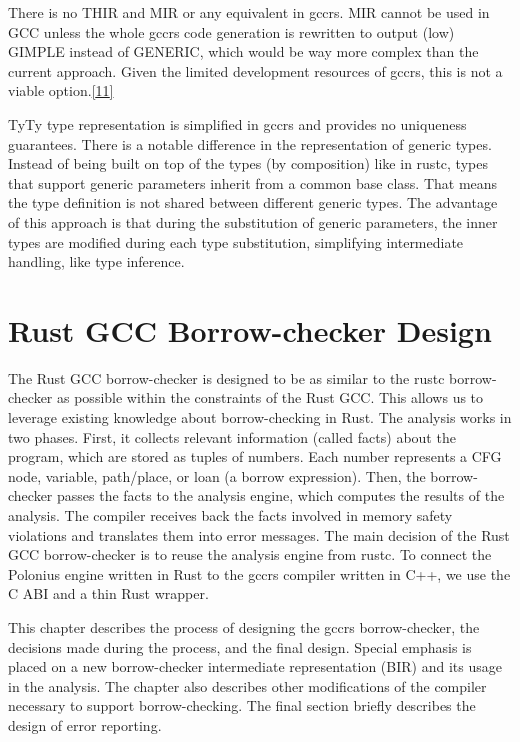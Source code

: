\documentclass[
  11pt,
  twoside,symmetric]{report}
\begin{document}
There is no THIR and MIR or any equivalent in gccrs. MIR cannot be used
in GCC unless the whole gccrs code generation is rewritten to output
(low) GIMPLE instead of GENERIC, which would be way more complex than
the current approach. Given the limited development resources of gccrs,
this is not a viable option.\protect\hyperlink{ref-zulip}{{[}11{]}}

TyTy type representation is simplified in gccrs and provides no
uniqueness guarantees. There is a notable difference in the
representation of generic types. Instead of being built on top of the
types (by composition) like in rustc, types that support generic
parameters inherit from a common base class. That means the type
definition is not shared between different generic types. The advantage
of this approach is that during the substitution of generic parameters,
the inner types are modified during each type substitution, simplifying
intermediate handling, like type inference.

\hypertarget{rust-gcc-borrow-checker-design}{%
\chapter{Rust GCC Borrow-checker
Design}\label{rust-gcc-borrow-checker-design}}

The Rust GCC borrow-checker is designed to be as similar to the rustc
borrow-checker as possible within the constraints of the Rust GCC. This
allows us to leverage existing knowledge about borrow-checking in Rust.
The analysis works in two phases. First, it collects relevant
information (called facts) about the program, which are stored as tuples
of numbers. Each number represents a CFG node, variable, path/place, or
loan (a borrow expression). Then, the borrow-checker passes the facts to
the analysis engine, which computes the results of the analysis. The
compiler receives back the facts involved in memory safety violations
and translates them into error messages. The main decision of the Rust
GCC borrow-checker is to reuse the analysis engine from rustc. To
connect the Polonius engine written in Rust to the gccrs compiler
written in C++, we use the C ABI and a thin Rust wrapper.

This chapter describes the process of designing the gccrs
borrow-checker, the decisions made during the process, and the final
design. Special emphasis is placed on a new borrow-checker intermediate
representation (BIR) and its usage in the analysis. The chapter also
describes other modifications of the compiler necessary to support
borrow-checking. The final section briefly describes the design of error
reporting.
\end{document}
